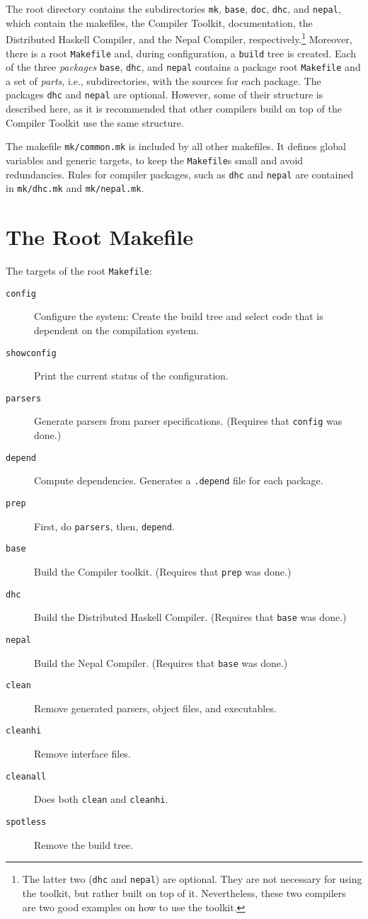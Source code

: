 \documentclass{report}
\newcommand{\code}[1]{\texttt{#1}}
\begin{document}
The root directory contains the subdirectories \code{mk}, \code{base},
\code{doc}, \code{dhc}, and \code{nepal}, which contain the makefiles, the
Compiler Toolkit, documentation, the Distributed Haskell Compiler, and the
Nepal Compiler, respectively.\footnote{The latter two (\code{dhc} and
  \code{nepal}) are optional.  They are not necessary for using the toolkit,
  but rather built on top of it.  Nevertheless, these two compilers are two
  good examples on how to use the toolkit.}  Moreover, there is a root
\code{Makefile} and, during configuration, a \code{build} tree is created.
Each of the three \emph{packages} \code{base}, \code{dhc}, and \code{nepal}
contains a package root \code{Makefile} and a set of \emph{parts}, i.e.,
subdirectories, with the sources for each package.  The packages \code{dhc}
and \code{nepal} are optional.  However, some of their structure is described
here, as it is recommended that other compilers build on top of the Compiler
Toolkit use the same structure.

The makefile \code{mk/common.mk} is included by all other makefiles.  It
defines global variables and generic targets, to keep the \code{Makefile}s
small and avoid redundancies.  Rules for compiler packages, such as \code{dhc} 
and \code{nepal} are contained in \code{mk/dhc.mk} and \code{mk/nepal.mk}.


\section{The Root Makefile}

The targets of the root \code{Makefile}:
%
\begin{description}
\item[\code{config}] Configure the system: Create the build tree and select
  code that is dependent on the compilation system.
\item[\code{showconfig}] Print the current status of the configuration.
\item[\code{parsers}] Generate parsers from parser specifications. (Requires
  that \code{config} was done.)
\item[\code{depend}] Compute dependencies.  Generates a \code{.depend} file
  for each package.
\item[\code{prep}] First, do \code{parsers}, then, \code{depend}.
\item[\code{base}] Build the Compiler toolkit. (Requires that \code{prep} was
  done.) 
\item[\code{dhc}] Build the Distributed Haskell Compiler. (Requires that
  \code{base} was done.)
\item[\code{nepal}] Build the Nepal Compiler. (Requires that \code{base} was
  done.)
\item[\code{clean}] Remove generated parsers, object files, and executables.
\item[\code{cleanhi}] Remove interface files.
\item[\code{cleanall}] Does both \code{clean} and \code{cleanhi}.
\item[\code{spotless}] Remove the build tree.
\end{description}
\end{document}
